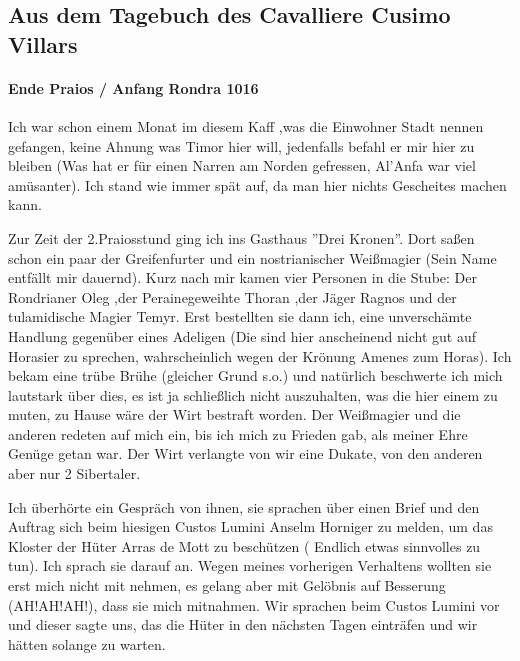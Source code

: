 \subsection{Aus dem Tagebuch des Cavalliere Cusimo Villars}

\paragraph{Ende Praios / Anfang Rondra 1016}
Ich war schon einem Monat im diesem Kaff ,was die Einwohner Stadt nennen gefangen, keine Ahnung was Timor hier will, jedenfalls befahl er mir hier zu bleiben (Was hat er für einen Narren am Norden gefressen, Al'Anfa war viel amüsanter).
Ich stand wie immer spät auf, da man hier nichts Gescheites machen kann.\par
Zur Zeit der 2.Praiosstund ging ich ins Gasthaus ''Drei Kronen''. Dort saßen schon ein paar der Greifenfurter und ein nostrianischer Weißmagier (Sein Name entfällt mir dauernd). Kurz nach mir kamen vier Personen in die Stube: Der Rondrianer Oleg ,der Perainegeweihte Thoran ,der Jäger Ragnos und der tulamidische Magier Temyr. Erst bestellten sie dann ich, eine unverschämte Handlung gegenüber eines Adeligen (Die sind hier anscheinend nicht gut auf Horasier zu sprechen, wahrscheinlich wegen der Krönung Amenes zum Horas). Ich bekam eine trübe Brühe (gleicher Grund s.o.) und natürlich beschwerte ich mich lautstark über dies, es ist ja schließlich nicht auszuhalten, was die hier einem zu muten, zu Hause wäre der Wirt bestraft worden. Der Weißmagier und die anderen redeten auf mich ein, bis ich mich zu Frieden gab, als meiner Ehre Genüge getan war. Der Wirt verlangte von wir eine Dukate, von den anderen aber nur 2 Sibertaler.\par
Ich überhörte ein Gespräch von ihnen, sie sprachen über einen Brief und den Auftrag sich beim hiesigen Custos Lumini Anselm Horniger zu melden, um das Kloster der Hüter Arras de Mott zu beschützen ( Endlich etwas sinnvolles zu tun). Ich sprach sie darauf an. Wegen meines vorherigen Verhaltens wollten sie erst mich nicht mit nehmen, es gelang aber mit Gelöbnis auf Besserung (AH!AH!AH!), dass sie mich mitnahmen. Wir sprachen beim Custos Lumini vor und dieser sagte uns, das die Hüter in den nächsten Tagen einträfen und wir hätten solange zu warten.\par
